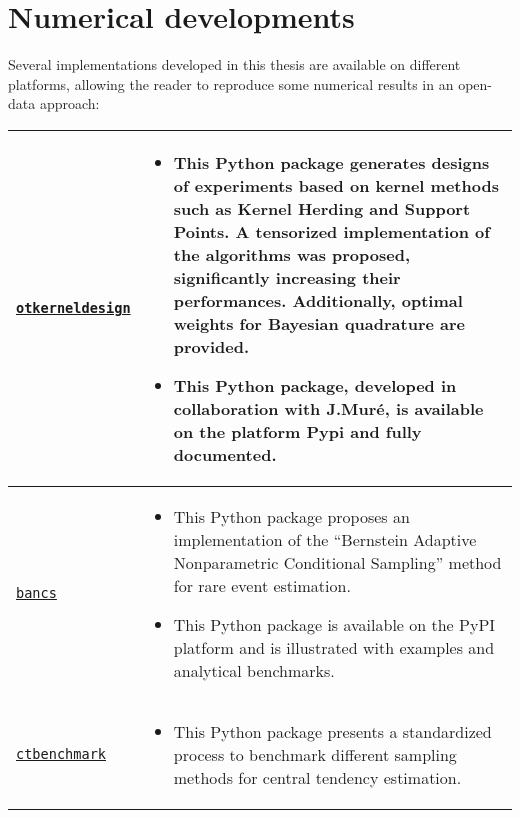 \clearpage
\section*{Numerical developments}

Several implementations developed in this thesis are available on different platforms, allowing the reader to reproduce some numerical results in an open-data approach:  

\begin{center}
\footnotesize
\begin{tabularx}{\textwidth}{l >{\raggedleft\arraybackslash}X}
    \texttt{\href{https://efekhari27.github.io/otkerneldesign/master/}{otkerneldesign}}\footnotemark
    &    
    \begin{itemize}[left=0pt]
        \item This Python package generates designs of experiments based on kernel methods such as Kernel Herding and Support Points. 
        A tensorized implementation of the algorithms was proposed, significantly increasing their performances. 
        Additionally, optimal weights for Bayesian quadrature are provided. 
        \item This Python package, developed in collaboration with J.Muré, is available on the platform Pypi and fully documented.
    \end{itemize}\\ \hline
    \texttt{\href{https://github.com/efekhari27/bancs}{bancs}}\footnotemark &    
    \begin{itemize}[left=0pt]
        \item This Python package proposes an implementation of the ``Bernstein Adaptive Nonparametric Conditional Sampling'' method for rare event estimation. 
        \item This Python package is available on the PyPI platform and is illustrated with examples and analytical benchmarks.
    \end{itemize}\\ \hline
    \texttt{\href{https://github.com/efekhari27/ctbenchmark}{ctbenchmark}}\footnotemark &    
    \begin{itemize}[left=0pt]
        \item This Python package presents a standardized process to benchmark different sampling methods for central tendency estimation. 

\end{itemize}
\end{tabularx}
\end{center}
